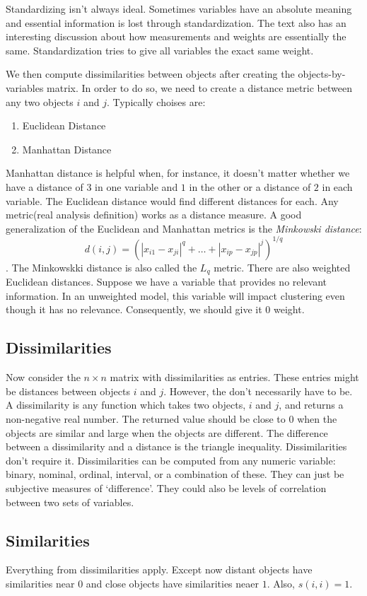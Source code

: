 \documentclass{article}
\begin{document}
Standardizing isn't always ideal. Sometimes variables have an absolute meaning and essential information is lost through standardization. The text also has an interesting discussion about how measurements and weights are essentially the same. Standardization tries to give all variables the exact same weight. 

We then compute dissimilarities between objects after creating the objects-by-variables matrix. In order to do so, we need to create a distance metric between any two objects $i$ and $j$. Typically choises are:
\begin{enumerate}
\item Euclidean Distance
\item Manhattan Distance
\end{enumerate}
Manhattan distance is helpful when, for instance, it doesn't matter whether we have a distance of $3$ in one variable and $1$ in the other or a distance of $2$ in each variable. The Euclidean distance would find different distances for each. Any metric(real analysis definition) works as a distance measure. A good generalization of the Euclidean and Manhattan metrics is the {\it Minkowski distance}: $$ d(i, j) = (|x_{i1} -x_{ji}|^q + \dots + |x_{ip} - x_{jp}|^j)^{1/q}$$. The Minkowskki distance is also called the $L_q$ metric. There are also weighted Euclidean distances. Suppose we have a variable that provides no relevant information. In an unweighted model, this variable will impact clustering even though it has no relevance. Consequently, we should give it 0 weight. 

\subsection*{Dissimilarities}
Now consider the $n\times n$ matrix with dissimilarities as entries. These entries might be distances between objects $i$ and $j$. However, the don't necessarily have to be. A dissimilarity is any function which takes two objects, $i$ and $j$, and returns a non-negative real number. The returned value should be close to 0 when the objects are similar and large when the objects are different. The difference between a dissimilarity and a distance is the triangle inequality. Dissimilarities don't require it. Dissimilarities can be computed from any numeric variable: binary, nominal, ordinal, interval, or a combination of these. They can just be subjective measures of `difference'. They could also be levels of correlation between two sets of variables. 

\subsection*{Similarities}
Everything from dissimilarities apply. Except now distant objects have similarities near $0$ and close objects have similarities neaer $1$. Also, $s(i, i) = 1$. 
\end{document}
